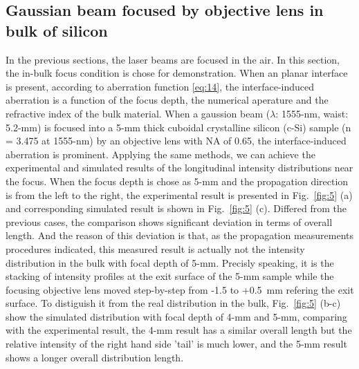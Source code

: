 \documentclass[9pt,twocolumn,twoside]{osajnl}
\begin{document}
\subsection{Gaussian beam focused by objective lens in bulk of silicon}
In the previous sections, the laser beams are focused in the air. In this section, the in-bulk focus condition is chose for demonstration. When an planar interface is present, according to aberration function \eqref{eq:14}, the interface-induced aberration is a function of the focus depth, the numerical aperature and the refractive index of the bulk material. When a gaussion beam ($\lambda$: 1555-nm, waist: 5.2-mm) is focused into a 5-mm thick cuboidal crystalline silicon (c-Si) sample (n = 3.475 at 1555-nm) by an objective lens with NA of 0.65, the interface-induced aberration is prominent. Applying the same methods, we can achieve the experimental and simulated results of the longitudinal intensity distributions near the focus. When the focus depth is chose as 5-mm and the propagation direction is from the left to the right, the experimental result is presented in Fig.~\ref{fig:5} (a) and corresponding simulated result is shown in Fig.~\ref{fig:5} (c). Differed from the previous cases, the comparison shows significant deviation in terms of overall length. And the reason of this deviation is that, as the propagation measurements procedures indicated, this measured result is actually not the intensity distribution in the bulk with focal depth of 5-mm. Precisly speaking, it is the stacking of intensity profiles at the exit surface of the 5-mm sample while the focusing objective lens moved step-by-step from -1.5 to +0.5~mm refering the exit surface. To distiguish it from the real distribution in the bulk, Fig.~\ref{fig:5} (b-c) show the simulated distribution with focal depth of 4-mm and 5-mm, comparing with the experimental result, the 4-mm result has a similar overall length but the relative intensity of the right hand side 'tail' is much lower, and the 5-mm result shows a longer overall distribution length.
\end{document}
